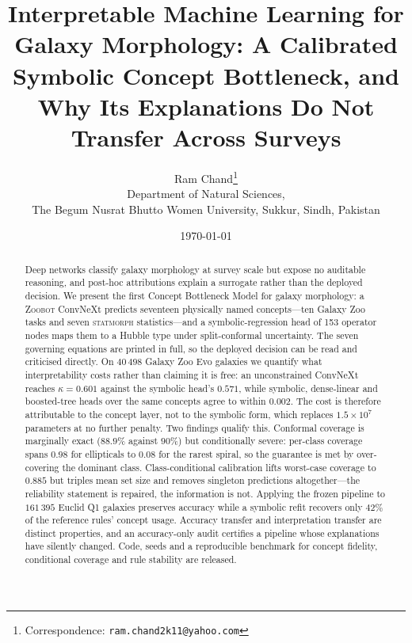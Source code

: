 \documentclass[11pt]{article}
\begin{document}
\title{\bfseries Interpretable Machine Learning for Galaxy Morphology:
A Calibrated Symbolic Concept Bottleneck, and Why Its Explanations Do Not
Transfer Across Surveys}

\author{
  Ram Chand\thanks{Correspondence: \texttt{ram.chand2k11@yahoo.com}}\\[2pt]
  \normalsize Department of Natural Sciences,\\
  \normalsize The Begum Nusrat Bhutto Women University, Sukkur, Sindh, Pakistan
}

\date{\today}

\maketitle

\begin{abstract}
Deep networks classify galaxy morphology at survey scale but expose no
auditable reasoning, and post-hoc attributions explain a surrogate rather than
the deployed decision. We present the first Concept Bottleneck Model for
galaxy morphology: a \textsc{Zoobot} ConvNeXt predicts seventeen physically
named concepts---ten Galaxy Zoo tasks and seven \textsc{statmorph}
statistics---and a symbolic-regression head of 153 operator nodes maps them to
a Hubble type under split-conformal uncertainty. The seven governing equations
are printed in full, so the deployed decision can be read and criticised
directly. On $40\,498$ Galaxy Zoo Evo galaxies we quantify what
interpretability costs rather than claiming it is free: an unconstrained
ConvNeXt reaches $\kappa=0.601$ against the symbolic head's $0.571$, while
symbolic, dense-linear and boosted-tree heads over the same concepts agree to
within $0.002$. The cost is therefore attributable to the concept layer, not to
the symbolic form, which replaces $1.5\times10^{7}$ parameters at no further
penalty. Two findings qualify this. Conformal coverage is marginally exact
($88.9\%$ against $90\%$) but conditionally severe: per-class coverage spans
$0.98$ for ellipticals to $0.08$ for the rarest spiral, so the guarantee is met
by over-covering the dominant class. Class-conditional calibration lifts
worst-case coverage to $0.885$ but triples mean set size and removes singleton
predictions altogether---the reliability statement is repaired, the information
is not. Applying the frozen pipeline to $161\,395$ Euclid Q1 galaxies preserves
accuracy while a symbolic refit recovers only $42\%$ of the reference rules'
concept usage. Accuracy transfer and interpretation transfer are distinct
properties, and an accuracy-only audit certifies a pipeline whose explanations
have silently changed. Code, seeds and a reproducible benchmark for concept
fidelity, conditional coverage and rule stability are released.
\end{abstract}
\end{document}
